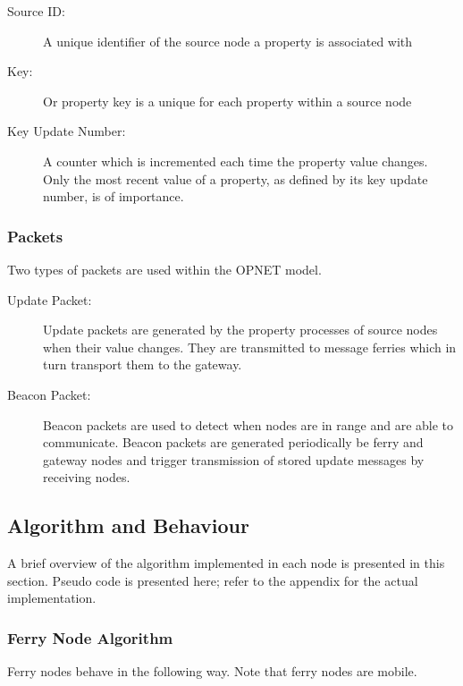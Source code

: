 \begin{description}
\item[Source ID: ] A unique identifier of the source node a property is associated with
\item[Key: ] Or property key is a unique for each property within a source node
\item[Key Update Number: ] A counter which is incremented each time the property value changes. 
Only the most recent value of a property, as defined by its key update number, is of importance.
\end{description}

\subsubsection{Packets}

Two types of packets are used within the OPNET model.

\begin{description}
\item[Update Packet: ]
Update packets are generated by the property processes of source nodes when their value changes.
They are transmitted to message ferries which in turn transport them to the gateway.
\item[Beacon Packet: ] 
Beacon packets are used to detect when nodes are in range and are able to communicate.
Beacon packets are generated periodically be ferry and gateway nodes and trigger transmission of stored update messages by receiving nodes.
\end{description}

\subsection{Algorithm and Behaviour}
\label{sec:algorithm}

A brief overview of the algorithm implemented in each node is presented in this section.
Pseudo code is presented here; refer to the appendix for the actual implementation.

\subsubsection{Ferry Node Algorithm}

Ferry nodes behave in the following way. Note that ferry nodes are mobile.

